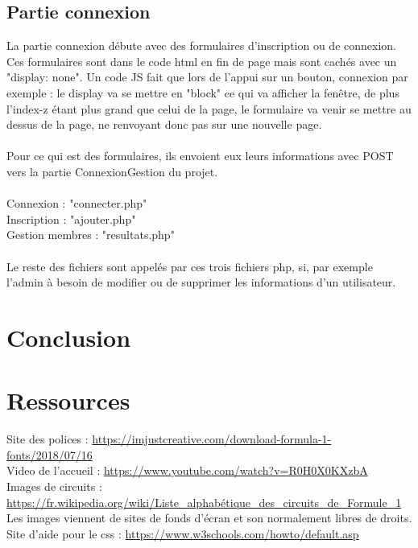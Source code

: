 \documentclass{article}
\begin{document}
\subsection{Partie connexion}

La partie connexion débute avec des formulaires d'inscription ou de connexion. Ces formulaires sont dans le code html en fin de page mais sont cachés avec un "display: none". Un code JS fait que lors de l'appui sur un bouton, connexion par exemple : le display va se mettre en "block" ce qui va afficher la fenêtre, de plus l'index-z étant plus grand que celui de la page, le formulaire va venir se mettre au dessus de la page, ne renvoyant donc pas sur une nouvelle page.
\\
\\
Pour ce qui est des formulaires, ils envoient eux leurs informations avec POST vers la partie ConnexionGestion du projet. \\ \\
Connexion : "connecter.php" \\
Inscription : "ajouter.php" \\
Gestion membres : "resultats.php" \\ \\
Le reste des fichiers sont appelés par ces trois fichiers php, si, par exemple l'admin à besoin de modifier ou de supprimer les informations d'un utilisateur.

\section{Conclusion}


\section{Ressources}

Site des polices : \url{https://imjustcreative.com/download-formula-1-fonts/2018/07/16}\\
Video de l'accueil : \url{https://www.youtube.com/watch?v=R0H0X0KXzbA}\\
Images de circuits : \url{https://fr.wikipedia.org/wiki/Liste_alphabétique_des_circuits_de_Formule_1}\\
Les images viennent de sites de fonds d'écran et son normalement libres de droits.
Site d'aide pour le css : \url{https://www.w3schools.com/howto/default.asp}\\
\end{document}
